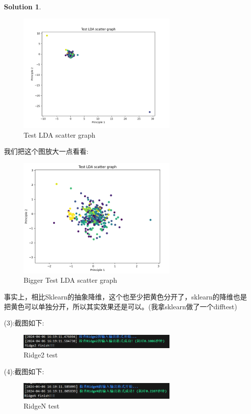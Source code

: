 \documentclass[a4paper]{article}
\numberwithin{equation}{section}
\theoremstyle{definition}
\newtheorem*{solution}{Solution}
\begin{document}
\begin{solution}
    \begin{figure}[H]
		\centering
		\includegraphics[width=0.7\textwidth]{Test LDA scatter graph.png}
		\caption{Test LDA scatter graph}
		\label{Test LDA scatter graph}
	\end{figure}
    我们把这个图放大一点看看:
    \begin{figure}[H]
		\centering
		\includegraphics[width=0.7\textwidth]{bigger.png}
		\caption{Bigger Test LDA scatter graph}
		\label{Bigger Test LDA scatter graph}
	\end{figure}
    事实上，相比Sklearn的抽象降维，这个也至少把黄色分开了，sklearn的降维也是把黄色可以单独分开，所以其实效果还是可以。(我拿sklearn做了一个difftest)

    (3):截图如下:\\
    \begin{figure}[H]
		\centering
		\includegraphics[width=0.7\textwidth]{Ridge2.png}
		\caption{Ridge2 test}
		\label{Ridge2 test}
	\end{figure}

    (4):截图如下:\\
    \begin{figure}[H]
		\centering
		\includegraphics[width=0.7\textwidth]{RidgeN.png}
		\caption{RidgeN test}
		\label{RidgeN test}
	\end{figure}


\end{solution}
\end{document}

